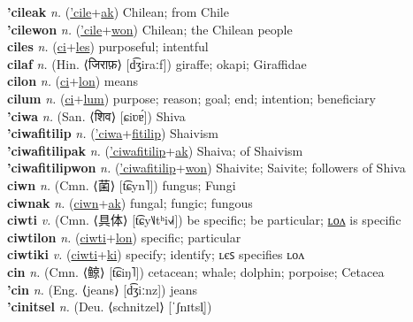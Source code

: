 \textbf{'cileak} \textit{n.} (\hyperref['cile]{'cile}+\hyperref[ak]{ak})
Chilean; from Chile \label{'cileak} \\
\textbf{'cilewon} \textit{n.} (\hyperref['cile]{'cile}+\hyperref[won]{won})
Chilean; the Chilean people \label{'cilewon} \\
\textbf{ciles} \textit{n.} (\hyperref[ci]{ci}+\hyperref[les]{les})
purposeful; intentful \label{ciles} \\
\textbf{cilaf} \textit{n.} (Hin. ⟨जिराफ़⟩ [d͡ʒiraːf])
giraffe; okapi; Giraffidae \label{cilaf} \\
\textbf{cilon} \textit{n.} (\hyperref[ci]{ci}+\hyperref[lon]{lon})
means \label{cilon} \\
\textbf{cilum} \textit{n.} (\hyperref[ci]{ci}+\hyperref[lum]{lum})
purpose; reason; goal; end; intention; beneficiary \label{cilum} \\
\textbf{'ciwa} \textit{n.} (San. ⟨शिव⟩ [ɕiʋɐ́])
Shiva \label{'ciwa} \\
\textbf{'ciwafitilip} \textit{n.} (\hyperref['ciwa]{'ciwa}+\hyperref[fitilip]{fitilip})
Shaivism \label{'ciwafitilip} \\
\textbf{'ciwafitilipak} \textit{n.} (\hyperref['ciwafitilip]{'ciwafitilip}+\hyperref[ak]{ak})
Shaiva; of Shaivism \label{'ciwafitilipak} \\
\textbf{'ciwafitilipwon} \textit{n.} (\hyperref['ciwafitilip]{'ciwafitilip}+\hyperref[won]{won})
Shaivite; Saivite; followers of Shiva \label{'ciwafitilipwon} \\
\textbf{ciwn} \textit{n.} (Cmn. ⟨菌⟩ [t͡ɕyn˥])
fungus; Fungi \label{ciwn} \\
\textbf{ciwnak} \textit{n.} (\hyperref[ciwn]{ciwn}+\hyperref[ak]{ak})
fungal; fungic; fungous \label{ciwnak} \\
\textbf{ciwti} \textit{v.} (Cmn. ⟨具体⟩ [t͡ɕy˥˩tʰi˧˩˧])
be specific; be particular; \hyperref[ciwtilon]{ʟᴏᴧ} is specific \label{ciwti} \\
\textbf{ciwtilon} \textit{n.} (\hyperref[ciwti]{ciwti}+\hyperref[lon]{lon})
specific; particular \label{ciwtilon} \\
\textbf{ciwtiki} \textit{v.} (\hyperref[ciwti]{ciwti}+\hyperref[ki]{ki})
specify; identify; ʟєꜱ specifies ʟᴏᴧ \label{ciwtiki} \\
\textbf{cin} \textit{n.} (Cmn. ⟨鲸⟩ [t͡ɕiŋ˥])
cetacean; whale; dolphin; porpoise; Cetacea \label{cin} \\
\textbf{'cin} \textit{n.} (Eng. ⟨jeans⟩ [d͡ʒiːnz])
jeans \label{'cin} \\
\textbf{'cinitsel} \textit{n.} (Deu. ⟨schnitzel⟩ [ˈʃnɪtsl̩])
